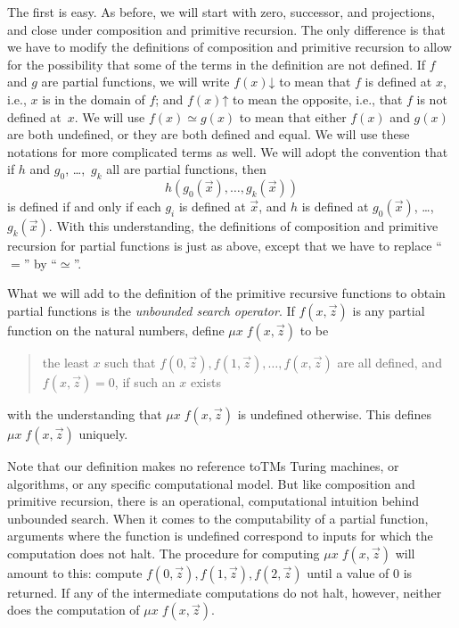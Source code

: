 \documentclass[10pt,a4paper]{article}
\theoremstyle{plain}
\theoremstyle{definition}
\theoremstyle{remark}
\newenvironment{explain}{}{}
\providecommand{\iftag}[1]{#1}
\providecommand{\fdefined}{\mathord{\downarrow}}
\providecommand{\fundefined}{\mathord{\uparrow}}
\providecommand{\iftag}{}
\begin{document}
The first is easy. As before, we will start with zero, successor, and
projections, and close under composition and primitive recursion. The
only difference is that we have to modify the definitions of
composition and primitive recursion to allow for the possibility that
some of the terms in the definition are not defined. If $f$ and $g$
are partial functions, we will write $f(x) \fdefined$ to mean that $f$
is defined at $x$, i.e., $x$ is in the domain of $f$; and $f(x)
\fundefined$ to mean the opposite, i.e., that $f$ is not defined at~$x$.
We will use $f(x) \simeq g(x)$ to mean that either $f(x)$ and $g(x)$
are both undefined, or they are both defined and equal. We will use these
notations for more complicated terms as well. We will adopt the
convention that if $h$ and $g_0$, \dots,~$g_k$ all are partial functions,
then
\[
h(g_0(\vec x),\dots,g_k(\vec x))
\]
is defined if and only if each $g_i$ is defined at $\vec x$, and $h$
is defined at $g_0(\vec x)$, \dots,~$g_k(\vec x)$. With this
understanding, the definitions of composition and primitive recursion
for partial functions is just as above, except that we have to replace
``$=$'' by ``$\simeq$''.

What we will add to the definition of the primitive recursive
functions to obtain partial functions is the \emph{unbounded search
  operator}. If $f(x,\vec z)$ is any partial function on the natural
numbers, define $\mu x \; f(x,\vec z)$ to be
\begin{quote}
  the least $x$ such that $f(0,\vec z), f(1,\vec z), \dots, f(x,\vec
  z)$ are all defined, and $f(x,\vec z) = 0$, if such an $x$ exists
\end{quote}
with the understanding that $\mu x \; f(x,\vec z)$ is undefined
otherwise. This defines $\mu x \; f(x,\vec z)$ uniquely.

\begin{explain}
Note that our definition makes no reference to\iftag{TMs}{ Turing
  machines, or}{} algorithms, or any specific computational model. But
like composition and primitive recursion, there is an operational,
computational intuition behind unbounded search. When it
comes to the computability of a partial function, arguments
where the function is undefined correspond to inputs for which the
computation does not halt. The procedure for computing $\mu x \;
f(x,\vec z)$ will amount to this: compute $f(0,\vec z), f(1,\vec z),
f(2,\vec z)$ until a value of 0 is returned. If any of the
intermediate computations do not halt, however, neither does the
computation of $\mu x \; f(x,\vec z)$.
\end{explain}
\end{document}
